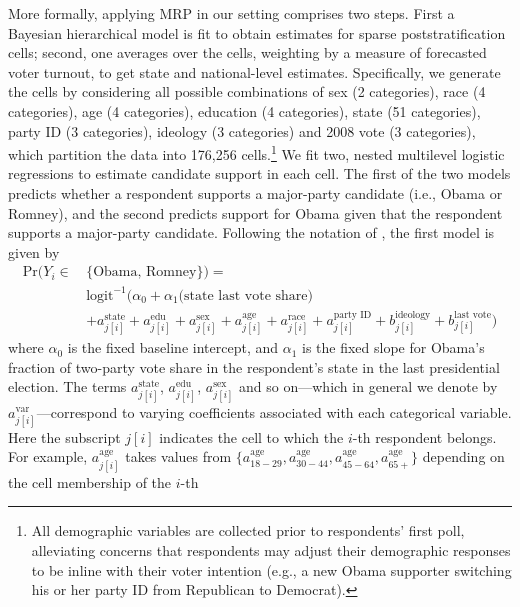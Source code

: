 \documentclass[preprint,authoryear,12pt]{elsarticle}
\begin{document}
More formally, applying MRP in our setting comprises two steps. First a Bayesian hierarchical model is fit to obtain estimates for sparse
poststratification cells; second, one averages over the cells, weighting by a measure of forecasted voter turnout, to get state and national-level estimates. Specifically, we generate the cells by considering all possible combinations of sex (2 categories), race (4 categories), age (4 categories), education
(4 categories), state (51 categories), party ID (3 categories), ideology (3
categories) and 2008 vote (3 categories), which partition the data into 176,256
cells.\footnote{All demographic variables are collected prior to respondents' first poll, alleviating concerns that respondents may adjust their demographic responses to be inline with their voter intention (e.g., a new Obama supporter switching his or her party ID from Republican to Democrat).} We fit two, nested multilevel logistic regressions to estimate
candidate support in each cell. The first of the two models predicts
whether a respondent supports a major-party candidate (i.e., Obama or Romney), and the
second predicts support for Obama given that the respondent supports a
major-party candidate. Following the notation of \citet{gelman2007data}, the
first model is given by
\begin{align}\label{eqn:m1}
  \text{Pr}(Y_i \in \, &\{\text{Obama, Romney}\})=\nonumber\\
  &\text{logit}^{-1}\big(\alpha_0+  \alpha_1\text{(state last vote share)} \\
  &+ a^{\text{state}}_{j[i]}+a^{\text{edu}}_{j[i]}+a^{\text{sex}}_{j[i]}+a^{\text{age}}_{j[i]}
  +a^{\text{race}}_{j[i]}+a^{\text{party ID}}_{j[i]}
  +b^{\text{ideology}}_{j[i]} + b^{\text{last vote}}_{j[i]} \big)\nonumber
\end{align}
where $\alpha_0$ is the fixed baseline intercept, and
$\alpha_1$ is the fixed slope for Obama's fraction of two-party
vote share in the respondent's state in the last presidential election.
The terms $a^{\text{state}}_{j[i]}$, $a^{\text{edu}}_{j[i]}$, $a^{\text{sex}}_{j[i]}$ and so on---which in general we denote by $a^{\text{var}}_{j[i]}$---correspond to varying coefficients associated with each categorical variable.
Here the subscript $j[i]$ indicates the cell to which the $i$-th
respondent belongs. For example, $a^{\text{age}}_{j[i]}$ takes values
from $\{a^{\text{age}}_{18-29}, a^{\text{age}}_{30-44}, a^{\text{age}}_{45-64},
a^{\text{age}}_{65+}\}$ depending on the cell membership of the $i$-th
\end{document}
